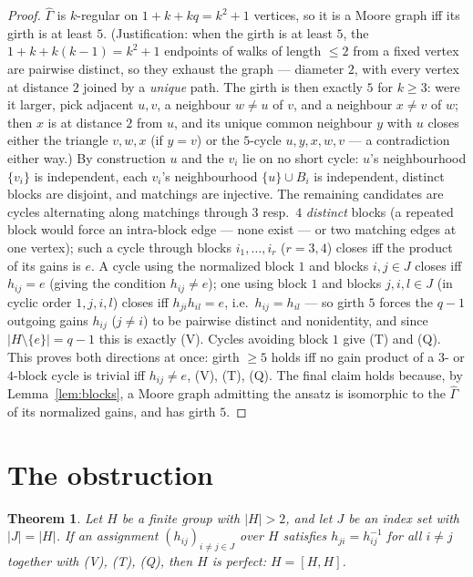 \documentclass[10pt]{article}
\newtheorem{theorem}{Theorem}
\newcommand{\id}{e}
\begin{document}
\begin{proof}
$\widehat\Gamma$ is $k$-regular on $1+k+kq=k^2+1$ vertices, so it is a
Moore graph iff its girth is at least $5$. (Justification: when the
girth is at least $5$, the $1+k+k(k-1)=k^2+1$ endpoints of walks of
length $\le 2$ from a fixed vertex are pairwise distinct, so they
exhaust the graph --- diameter $2$, with every vertex at distance $2$
joined by a \emph{unique} path. The girth is then exactly $5$ for
$k\ge 3$: were it larger, pick adjacent $u,v$, a neighbour $w\ne u$ of
$v$, and a neighbour $x\ne v$ of $w$; then $x$ is at distance $2$ from
$u$, and its unique common neighbour $y$ with $u$ closes either the
triangle $v,w,x$ (if $y=v$) or the $5$-cycle $u,y,x,w,v$ --- a
contradiction either way.) By construction $u$ and the
$v_i$ lie on no short cycle: $u$'s neighbourhood $\{v_i\}$ is
independent, each $v_i$'s neighbourhood $\{u\}\cup B_i$ is independent,
distinct blocks are disjoint, and matchings are injective. The
remaining candidates are cycles alternating along matchings through $3$
resp.\ $4$ \emph{distinct} blocks (a repeated block would force an
intra-block edge --- none exist --- or two matching edges at one
vertex); such a cycle through blocks $i_1,\dots,i_r$ ($r=3,4$) closes
iff the product of its gains is $\id$. A cycle using the normalized
block $1$ and blocks $i,j\in J$ closes iff $h_{ij}=\id$ (giving the
condition $h_{ij}\neq\id$); one using block $1$ and blocks
$j,i,l\in J$ (in cyclic order $1,j,i,l$) closes iff
$h_{ji}h_{il}=\id$, i.e.\ $h_{ij}=h_{il}$ --- so girth $5$ forces the
$q-1$ outgoing gains $h_{ij}$ ($j\ne i$) to be pairwise distinct and
nonidentity, and since $|H\setminus\{\id\}|=q-1$ this is exactly (V).
Cycles avoiding block $1$ give (T) and (Q). This proves both
directions at once: girth $\geq 5$ holds iff no gain product of a
$3$- or $4$-block cycle is trivial iff $h_{ij}\ne\id$, (V), (T), (Q).
The final claim holds because, by Lemma~\ref{lem:blocks}, a Moore graph
admitting the ansatz is isomorphic to the $\widehat\Gamma$ of its
normalized gains, and has girth $5$.
\end{proof}

\section{The obstruction}

\begin{theorem}\label{thm:perfect}
Let $H$ be a finite group with $|H|>2$, and let $J$ be an index set
with $|J|=|H|$. If an assignment $(h_{ij})_{i\neq j\in J}$ over $H$
satisfies $h_{ji}=h_{ij}^{-1}$ for all $i\ne j$ together with
\textup{(V)}, \textup{(T)}, \textup{(Q)}, then $H$ is perfect:
$H=[H,H]$.
\end{theorem}
\end{document}
